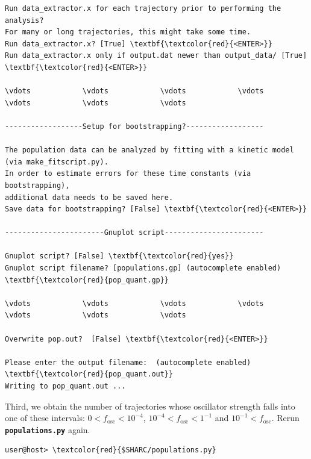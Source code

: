\documentclass[a4paper,11pt,DIV=15,openany]{scrbook}
\newcommand{\ttt}[1]{\textbf{\texttt{#1}}}
\begin{document}
\begin{oframed}
\begin{Verbatim}[commandchars=\\\{\}]
Run data_extractor.x for each trajectory prior to performing the analysis?
For many or long trajectories, this might take some time.
Run data_extractor.x? [True] \textbf{\textcolor{red}{<ENTER>}}
Run data_extractor.x only if output.dat newer than output_data/ [True] \textbf{\textcolor{red}{<ENTER>}}

\vdots            \vdots            \vdots            \vdots            \vdots            \vdots            \vdots            

------------------Setup for bootstrapping?------------------

The population data can be analyzed by fitting with a kinetic model (via make_fitscript.py). 
In order to estimate errors for these time constants (via bootstrapping), 
additional data needs to be saved here.
Save data for bootstrapping? [False] \textbf{\textcolor{red}{<ENTER>}}

-----------------------Gnuplot script-----------------------

Gnuplot script? [False] \textbf{\textcolor{red}{yes}}
Gnuplot script filename? [populations.gp] (autocomplete enabled) \textbf{\textcolor{red}{pop_quant.gp}}

\vdots            \vdots            \vdots            \vdots            \vdots            \vdots            \vdots            

Overwrite pop.out?  [False] \textbf{\textcolor{red}{<ENTER>}}

Please enter the output filename:  (autocomplete enabled) \textbf{\textcolor{red}{pop_quant.out}}
Writing to pop_quant.out ...
\end{Verbatim}
\end{oframed}

\normalsize
Third, we obtain the number of trajectories whose oscillator strength falls into one of these intervals: $0<f_\text{osc}<10^{-4}$, $10^{-4}<f_\text{osc}<1^{-1}$ and $10^{-1}<f_\text{osc}$. Rerun \ttt{populations.py} again.
\begin{Verbatim}[commandchars=\\\{\}]
user@host> \textcolor{red}{$SHARC/populations.py}
\end{Verbatim}
\end{document}
